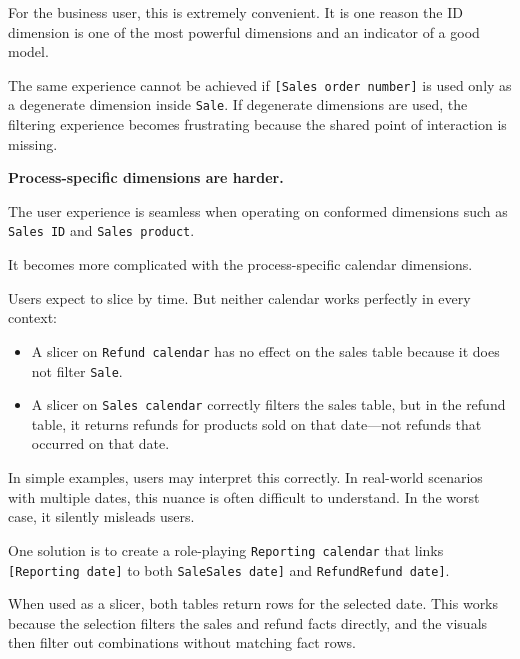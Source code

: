 \documentclass[10pt,openany,10pt]{book}
\providecommand{\tightlist}{%
  \setlength{\itemsep}{0pt}\setlength{\parskip}{0pt}}
\begin{document}
For the business user, this is extremely convenient. It is one reason
the ID dimension is one of the most powerful dimensions and an indicator
of a good model.

The same experience cannot be achieved if
\texttt{{[}Sales\ order\ number{]}} is used only as a degenerate
dimension inside \texttt{\textquotesingle{}Sale\textquotesingle{}}. If
degenerate dimensions are used, the filtering experience becomes
frustrating because the shared point of interaction is missing.

\textbf{Process-specific dimensions are harder.}

The user experience is seamless when operating on conformed dimensions
such as \texttt{\textquotesingle{}Sales\ ID\textquotesingle{}} and
\texttt{\textquotesingle{}Sales\ product\textquotesingle{}}.

It becomes more complicated with the process-specific calendar
dimensions.

Users expect to slice by time. But neither calendar works perfectly in
every context:

\begin{itemize}
\tightlist
\item
  A slicer on
  \texttt{\textquotesingle{}Refund\ calendar\textquotesingle{}} has no
  effect on the sales table because it does not filter
  \texttt{\textquotesingle{}Sale\textquotesingle{}}.
\item
  A slicer on
  \texttt{\textquotesingle{}Sales\ calendar\textquotesingle{}} correctly
  filters the sales table, but in the refund table, it returns refunds
  for products sold on that date---not refunds that occurred on that
  date.
\end{itemize}

In simple examples, users may interpret this correctly. In real-world
scenarios with multiple dates, this nuance is often difficult to
understand. In the worst case, it silently misleads users.

One solution is to create a role-playing
\texttt{\textquotesingle{}Reporting\ calendar\textquotesingle{}} that
links \texttt{{[}Reporting\ date{]}} to both
\texttt{\textquotesingle{}Sale\textquotesingle{}{[}Sales\ date{]}} and
\texttt{\textquotesingle{}Refund\textquotesingle{}{[}Refund\ date{]}}.

When used as a slicer, both tables return rows for the selected date.
This works because the selection filters the sales and refund facts
directly, and the visuals then filter out combinations without matching
fact rows.
\end{document}

